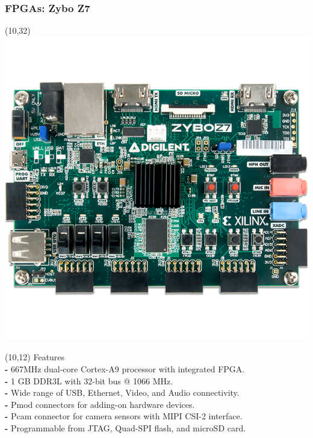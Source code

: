 \documentclass[aspectratio=169]{beamer}
\begin{document}
\begin{frame}[fragile,t]
    \frametitle{FPGAs: Zybo Z7} %
    \begin{textblock}{75}(10,32)
    \includegraphics[scale=.3]{img/zybo-z7-4.png}
    \end{textblock}
    \begin{textblock}{70}(10,12)
    \small Features\\
    \vspace{0.2cm}
    \scriptsize
    \textcolor{naranjauca}{\textbf{-}} 667MHz dual-core Cortex-A9 processor with integrated FPGA.\\
    \textcolor{naranjauca}{\textbf{-}} 1 GB DDR3L with 32-bit bus @ 1066 MHz.\\
    \textcolor{naranjauca}{\textbf{-}} Wide range of USB, Ethernet, Video, and Audio connectivity.\\
    \textcolor{naranjauca}{\textbf{-}} Pmod connectors for adding-on hardware devices.\\
    \textcolor{naranjauca}{\textbf{-}} Pcam connector for camera sensors with MIPI CSI-2 interface.\\
    \textcolor{naranjauca}{\textbf{-}} Programmable from JTAG, Quad-SPI flash, and microSD card.\\
    \end{textblock}

\end{frame}
\end{document}

